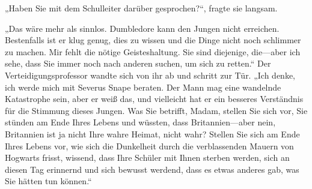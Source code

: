 „Haben Sie mit dem Schulleiter darüber gesprochen?“, fragte sie langsam.

„Das wäre mehr als sinnlos. Dumbledore kann den Jungen nicht erreichen. Bestenfalls ist er klug genug, dies zu wissen und die Dinge nicht noch schlimmer zu machen. Mir fehlt die nötige Geisteshaltung. Sie sind diejenige, die—aber ich sehe, dass Sie immer noch nach anderen suchen, um sich zu retten.“
Der Verteidigungsprofessor wandte sich von ihr ab und schritt zur Tür.
„Ich denke, ich werde mich mit Severus Snape beraten. Der Mann mag eine wandelnde Katastrophe sein, aber er weiß das, und vielleicht hat er ein besseres Verständnis für die Stimmung dieses Jungen. Was Sie betrifft, Madam, stellen Sie sich vor, Sie stünden am Ende Ihres Lebens und wüssten, dass Britannien—aber nein, Britannien ist ja nicht Ihre wahre Heimat, nicht wahr? Stellen Sie sich am Ende Ihres Lebens vor, wie sich die Dunkelheit durch die verblassenden Mauern von Hogwarts frisst, wissend, dass Ihre Schüler mit Ihnen sterben werden, sich an diesen Tag erinnernd und sich bewusst werdend, dass es etwas anderes gab, was Sie hätten tun können.“

